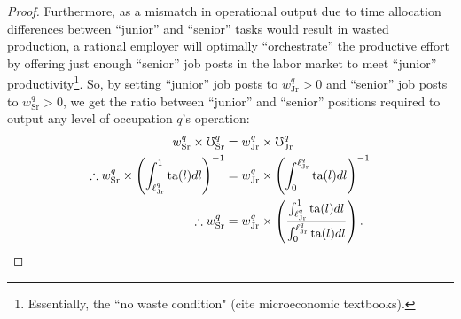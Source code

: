 \documentclass[hidelinks, nonatbib]{elsarticle}
\begin{document}
\begin{theorem}
\begin{proof}
        Furthermore, as a mismatch in operational output due to time allocation differences between ``junior'' and ``senior'' tasks would result in wasted production, a rational employer will optimally ``orchestrate'' the productive effort by offering just enough ``senior'' job posts in the labor market to meet ``junior'' productivity\footnote{Essentially, the ``no waste condition" (cite microeconomic textbooks).}. So, by setting ``junior'' job posts to $w_{\text{Jr}}^{q} > 0$ and ``senior'' job posts to $w_{\text{Sr}}^{q} > 0$, we get the ratio between ``junior'' and ``senior'' positions required to output any level of occupation $q$'s operation:
        \begin{align}
            w_{\text{Sr}}^{q}
            \times 
            \mho_{\text{Sr}}^{q}
            &= 
            w_{\text{Jr}}^{q}
            \times 
            \mho_{\text{Jr}}^{q}
            \\
            \therefore
            w_{\text{Sr}}^{q}
            \times 
            \left(
                \int_{\ell_{\text{Jr}}^{q}}^{1}
                \text{ta}(l)
                dl
            \right) ^ {-1}
            &= 
            w_{\text{Jr}}^{q}
            \times
            \left(
                \int_{0}^{\ell_{\text{Jr}}^{q}}
                    \text{ta}(l)
                    dl
            \right) ^ {-1}
            \\
            \therefore
            w_{\text{Sr}}^{q}
            &= 
            w_{\text{Jr}}^{q}
            \times
            \left(
                \frac{
                    \int_{\ell_{\text{Jr}}^{q}}^{1}
                    \text{ta}(l)
                    dl
                }{
                    \int_{0}^{\ell_{\text{Jr}}^{q}}
                    \text{ta}(l)
                    dl
                }
            \right)
            .
        \end{align}
        

\end{proof}
\end{theorem}
\end{document}
